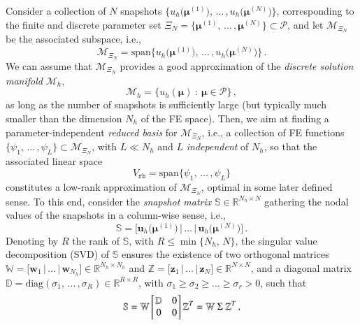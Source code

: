 \documentclass{elsarticle}
\numberwithin{equation}{section}
\theoremstyle{theorem}
\theoremstyle{definition}
\theoremstyle{remark}
\theoremstyle{proposition}
\numberwithin{figure}{section}
\newcommand{\bg}[1]{\boldsymbol{#1}}
\begin{document}
		Consider a collection of $N$ snapshots $\big\lbrace u_h \big( \bg{\mu}^{(1)} \big), \, \ldots \, , u_h \big( \bg{\mu}^{(N)} \big) \big\rbrace$, corresponding to the finite and discrete parameter set $\Xi_N = \big\lbrace \bg{\mu}^{(1)}, \, \ldots \, , \bg{\mu}^{(N)} \big\rbrace \subset \mathcal{P}$, and let $\mathcal{M}_{\Xi_N}$ be the associated subspace, i.e., \[ \mathcal{M}_{\Xi_N} = \text{span} \big\lbrace u_h \big( \bg{\mu}^{(1)} \big), \, \ldots \, , u_h \big( \bg{\mu}^{(N)} \big) \big\rbrace \, . \] We can assume that $\mathcal{M}_{\Xi_N}$ provides a good approximation of the \emph{discrete solution manifold} $\mathcal{M}_h$, \[ \mathcal{M}_h = \big\lbrace u_h(\bg{\mu}) ~ : ~ \bg{\mu} \in \mathcal{P} \big\rbrace \, , \] as long as the number of snapshots is sufficiently large (but typically much smaller than the dimension ${N_h}$ of the FE space). Then, we aim at finding a parameter-independent \emph{reduced basis} for $\mathcal{M}_{\Xi_N}$, i.e., a collection of FE functions $\big\lbrace \psi_1, \, \ldots \, , \psi_L \big\rbrace \subset \mathcal{M}_{\Xi_N}$, with $L \ll {N_h}$ and $L$ \emph{independent} of $N_h$, so that the associated linear space 
		\begin{equation*}
			V_{\texttt{rb}} = \text{span} \big\lbrace \psi_1, \, \ldots \, , \psi_L \big\rbrace
		\end{equation*}
		constitutes a low-rank approximation of $\mathcal{M}_{\Xi_N}$, optimal in some later defined sense. To this end, consider the \emph{snapshot matrix} $\mathbb{S} \in \mathbb{R}^{{N_h} \times N}$ gathering the nodal values of the snapshots in a column-wise sense, i.e.,
		\begin{equation*}
			\mathbb{S} = \big[ \mathbf{u}_h \big( \bg{\mu}^{(1)} \big) \, \big| \, \ldots \, \big| \, \mathbf{u}_h \big( \bg{\mu}^{(N)} \big) \big] \, .
		\end{equation*}
		Denoting by $R$ the rank of $\mathbb{S}$, with $R \leq \min \big\lbrace{ {N_h}, \, N \big\rbrace}$, the singular value decomposition (SVD) of $\mathbb{S}$ ensures the existence of two orthogonal matrices $\mathbb{W} = \big[ \mathbf{w}_1 \, \big| \, \ldots \, \big| \, \mathbf{w}_{N_h} \big] \in \mathbb{R}^{{N_h} \times {N_h}}$ and $\mathbb{Z} = \big[ \mathbf{z}_1 \, \big| \, \ldots \, \big| \, \mathbf{z}_N \big] \in \mathbb{R}^{N \times N}$, and a diagonal matrix $\mathbb{D} = \text{diag}(\sigma_1, \, \ldots \, , \sigma_R) \in \mathbb{R}^{R \times R}$, with $\sigma_1 \geq \sigma_2 \geq \ldots \geq \sigma_r > 0$, such that
		\begin{equation}
			\label{eq:svd}
			\mathbb{S} = \mathbb{W} 
			\begin{bmatrix}
			\hspace*{-0.15cm}
			\begin{array}{cc}
				\mathbb{D} & 0 \\
				0 & 0
			\end{array} 
			\hspace*{-0.15cm}
			\end{bmatrix}
			\mathbb{Z}^T = \mathbb{W} ~ \Sigma ~ \mathbb{Z}^T \, ,
		\end{equation}
\end{document}

